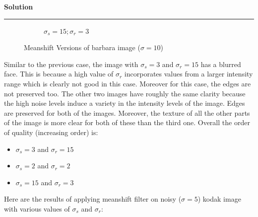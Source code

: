 \documentclass[a4paper]{article}
\newenvironment{solution}[2][]{%
    \begin{mdframed}[linecolor=green!60!black, linewidth=2pt, roundcorner=10pt, backgroundcolor=green!5!white, skipabove=12pt, skipbelow=12pt]%
        \textbf{\large #2} %
        \par\noindent\rule{\textwidth}{0.4pt} %
        \vspace{0.5em} %
}{%
    \end{mdframed}%
}
\begin{document}
\begin{solution}{Solution}
\begin{figure}[H]
\begin{subfigure}[b]{0.24\textwidth}
        \caption{$\sigma_s=15;\sigma_r=3$}
        \label{fig:subfig3}
    \end{subfigure}
    
    \caption{Meanshift Versions of barbara image ($\sigma=10$)}
    \label{fig:overall}
\end{figure}


Similar to the previous case, the image with $\sigma_s=3$ and $\sigma_r=15$ has a blurred face. This is because a high value of $\sigma_r$ incorporates values from a larger intensity range which is clearly not good in this case. Moreover for this case, the edges are not preserved too. The other two images have roughly the same clarity because the high noise levels induce a variety in the intensity levels of the image. Edges are preserved for both of the images. Moreover, the texture of all the other parts of the image is more clear for both of these than the third one. Overall the order of quality (increasing order) is:
\begin{itemize}
    \item $\sigma_s=3$ and $\sigma_r=15$
    \item $\sigma_s=2$ and $\sigma_r=2$
    \item $\sigma_s=15$ and $\sigma_r=3$
\end{itemize}



Here are the results of applying meanshift filter on noisy ($\sigma = 5$) kodak image with various values of $\sigma_s$ and $\sigma_r$:


\end{solution}
\end{document}
